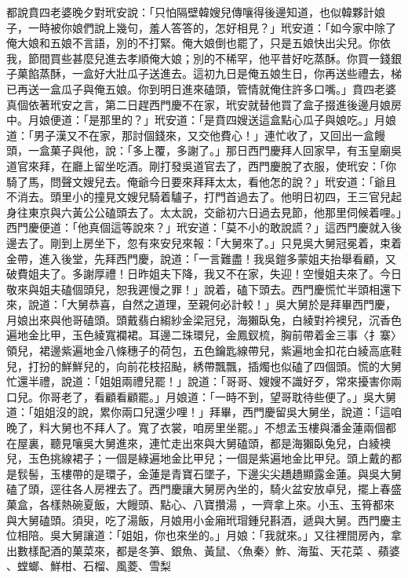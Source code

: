 \begin{showcontents}{}
都說賁四老婆晚夕對玳安說：「只怕隔壁韓嫂兒傳嚷得後邊知道，也似韓夥計娘子，一時被你娘們說上幾句，羞人答答的，怎好相見？」玳安道：「如今家中除了俺大娘和五娘不言語，別的不打緊。俺大娘倒也罷了，只是五娘快出尖兒。你依我，節間買些甚麼兒進去孝順俺大娘；別的不稀罕，他平昔好吃蒸酥。你買一錢銀子菓餡蒸酥，一盒好大壯瓜子送進去。這初九日是俺五娘生日，你再送些禮去，梯已再送一盒瓜子與俺五娘。你到明日進來磕頭，管情就俺住許多口嘴。」賁四老婆真個依著玳安之言，第二日趕西門慶不在家，玳安就替他買了盒子掇進後邊月娘房中。月娘便道：「是那里的？」玳安道：「是賁四嫂送這盒點心瓜子與娘吃。」月娘道：「男子漢又不在家，那討個錢來，又交他費心！」連忙收了，又回出一盒饅頭，一盒菓子與他，說：「多上覆，多謝了。」那日西門慶拜人回家早，有玉皇廟吳道官來拜，在廳上留坐吃酒。剛打發吳道官去了，西門慶脫了衣服，使玳安：「你騎了馬，問聲文嫂兒去。俺爺今日要來拜拜太太，看他怎的說？」玳安道：「爺且不消去。頭里小的撞見文嫂兒騎着驢子，打門首過去了。他明日初四，王三官兒起身往東京與六黃公公磕頭去了。太太說，交爺初六日過去見節，他那里伺候着哩。」西門慶便道：「他真個這等說來？」玳安道：「莫不小的敢說謊？」這西門慶就入後邊去了。剛到上房坐下，忽有來安兒來報：「大舅來了。」只見吳大舅冠冕着，束着金帶，進入後堂，先拜西門慶，說道：「一言難盡！我吳鎧多蒙姐夫抬舉看顧，又破費姐夫了。多謝厚禮！日昨姐夫下降，我又不在家，失迎！空慢姐夫來了。今日敬來與姐夫磕個頭兒，恕我遲慢之罪！」說着，磕下頭去。西門慶慌忙半頭相還下來，說道：「大舅恭喜，自然之道理，至親何必計較！」吳大舅於是拜畢西門慶，月娘出來與他哥磕頭。頭戴翡白縐紗金梁冠兒，海獺臥兔，白綾對衿襖兒，沉香色遍地金比甲，玉色綾寬襴裙。耳邊二珠環兒，金鳳釵梳，胸前帶着金三事〈扌寨〉領兒，裙邊紫遍地金八條穗子的荷包，五色鑰匙線帶兒，紫遍地金扣花白綾高底鞋兒，打扮的鮮鮮兒的，向前花枝招颭，綉帶飄飄，插燭也似磕了四個頭。慌的大舅忙還半禮，說道：「姐姐兩禮兒罷！」說道：「哥哥、嫂嫂不識好歹，常來擾害你兩口兒。你哥老了，看顧看顧罷。」月娘道：「一時不到，望哥耽待些便了。」吳大舅道：「姐姐沒的說，累你兩口兒還少哩！」拜畢，西門慶留吳大舅坐，說道：「這咱晚了，料大舅也不拜人了。寬了衣裳，咱房里坐罷。」不想孟玉樓與潘金蓮兩個都在屋裏，聽見嚷吳大舅進來，連忙走出來與大舅磕頭，都是海獺臥兔兒，白綾襖兒，玉色挑線裙子；一個是綠遍地金比甲兒；一個是紫遍地金比甲兒。頭上戴的都是䯼髻，玉樓帶的是環子，金蓮是青寶石墜子，下邊尖尖趫趫顯露金蓮。與吳大舅磕了頭，逕往各人房裡去了。西門慶讓大舅房內坐的，騎火盆安放卓兒，擺上春盛菓盒，各樣熱碗夏飯，大饅頭、點心、八寶攢湯 ，一齊拿上來。小玉、玉筲都來與大舅磕頭。須臾，吃了湯飯，月娘用小金廂玳瑁鍾兒斟酒，遞與大舅。西門慶主位相陪。吳大舅讓道：「姐姐，你也來坐的。」月娘：「我就來。」又往裡間房內，拿出數樣配酒的菓菜來，都是冬笋、銀魚、黃鼠、〈魚秦〉鮓、海蜇、天花菜 、蘋婆 、螳螂、鮮柑、石榴、風菱、雪梨 
\end{showcontents}

